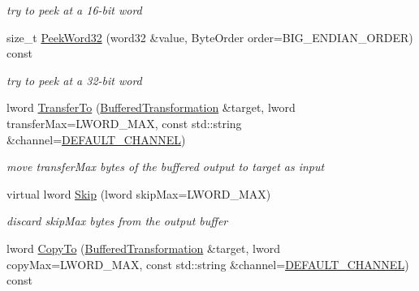 \begin{DoxyCompactItemize}
\begin{DoxyCompactList}\small\item\em try to peek at a 16-\/bit word \item\end{DoxyCompactList}\item 
\hypertarget{class_buffered_transformation_aee19b1f5f0df32de2f33bf6bded3bae6}{
size\_\-t \hyperlink{class_buffered_transformation_aee19b1f5f0df32de2f33bf6bded3bae6}{PeekWord32} (word32 \&value, ByteOrder order=BIG\_\-ENDIAN\_\-ORDER) const }
\label{class_buffered_transformation_aee19b1f5f0df32de2f33bf6bded3bae6}

\begin{DoxyCompactList}\small\item\em try to peek at a 32-\/bit word \item\end{DoxyCompactList}\item 
\hypertarget{class_buffered_transformation_ac31ac5d2da7897fb097086496b85e6f5}{
lword \hyperlink{class_buffered_transformation_ac31ac5d2da7897fb097086496b85e6f5}{TransferTo} (\hyperlink{class_buffered_transformation}{BufferedTransformation} \&target, lword transferMax=LWORD\_\-MAX, const std::string \&channel=\hyperlink{cryptlib_8h_a6f1917f54ea8c2a45de6e08c5087c8de}{DEFAULT\_\-CHANNEL})}
\label{class_buffered_transformation_ac31ac5d2da7897fb097086496b85e6f5}

\begin{DoxyCompactList}\small\item\em move transferMax bytes of the buffered output to target as input \item\end{DoxyCompactList}\item 
\hypertarget{class_buffered_transformation_aeeb0dc3afe27a96e3320c1d65a2007d3}{
virtual lword \hyperlink{class_buffered_transformation_aeeb0dc3afe27a96e3320c1d65a2007d3}{Skip} (lword skipMax=LWORD\_\-MAX)}
\label{class_buffered_transformation_aeeb0dc3afe27a96e3320c1d65a2007d3}

\begin{DoxyCompactList}\small\item\em discard skipMax bytes from the output buffer \item\end{DoxyCompactList}\item 
\hypertarget{class_buffered_transformation_a5253b8693ac9932f3862b71c9960903c}{
lword \hyperlink{class_buffered_transformation_a5253b8693ac9932f3862b71c9960903c}{CopyTo} (\hyperlink{class_buffered_transformation}{BufferedTransformation} \&target, lword copyMax=LWORD\_\-MAX, const std::string \&channel=\hyperlink{cryptlib_8h_a6f1917f54ea8c2a45de6e08c5087c8de}{DEFAULT\_\-CHANNEL}) const }
\label{class_buffered_transformation_a5253b8693ac9932f3862b71c9960903c}


\end{DoxyCompactItemize}
